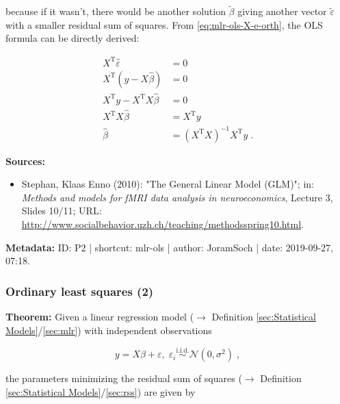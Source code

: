 \documentclass[a4paper,12pt,twoside]{book}
\begin{document}
because if it wasn't, there would be another solution $\tilde{\beta}$ giving another vector $\tilde{\varepsilon}$ with a smaller residual sum of squares. From \eqref{eq:mlr-ols-X-e-orth}, the OLS formula can be directly derived:

\begin{equation} \label{eq:mlr-ols-OLS-qed}
\begin{split}
X^\mathrm{T} \hat{\varepsilon} &= 0 \\
X^\mathrm{T} \left( y - X\hat{\beta} \right) &= 0 \\
X^\mathrm{T} y - X^\mathrm{T} X\hat{\beta} &= 0 \\
X^\mathrm{T} X\hat{\beta} &= X^\mathrm{T} y \\
\hat{\beta} &= (X^\mathrm{T} X)^{-1} X^\mathrm{T} y \; .
\end{split}
\end{equation}


\vspace{1em}
\textbf{Sources:}
\begin{itemize}
\item Stephan, Klaas Enno (2010): "The General Linear Model (GLM)"; in: \textit{Methods and models for fMRI data analysis in neuroeconomics}, Lecture 3, Slides 10/11; URL: \url{http://www.socialbehavior.uzh.ch/teaching/methodsspring10.html}.
\end{itemize}


\vspace{1em}
\textbf{Metadata:} ID: P2 | shortcut: mlr-ols | author: JoramSoch | date: 2019-09-27, 07:18.
\vspace{1em}



\subsubsection[\textbf{Ordinary least squares (2)}]{Ordinary least squares (2)} \label{sec:mlr-ols2}
\setcounter{equation}{0}

\textbf{Theorem:} Given a linear regression model ($\rightarrow$ Definition \ref{sec:Statistical Models}/\ref{sec:mlr}) with independent observations

\begin{equation} \label{eq:mlr-ols2-MLR}
y = X\beta + \varepsilon, \; \varepsilon_i \overset{\mathrm{i.i.d.}}{\sim} \mathcal{N}(0, \sigma^2) \; ,
\end{equation}

the parameters minimizing the residual sum of squares ($\rightarrow$ Definition \ref{sec:Statistical Models}/\ref{sec:rss}) are given by
\end{document}
